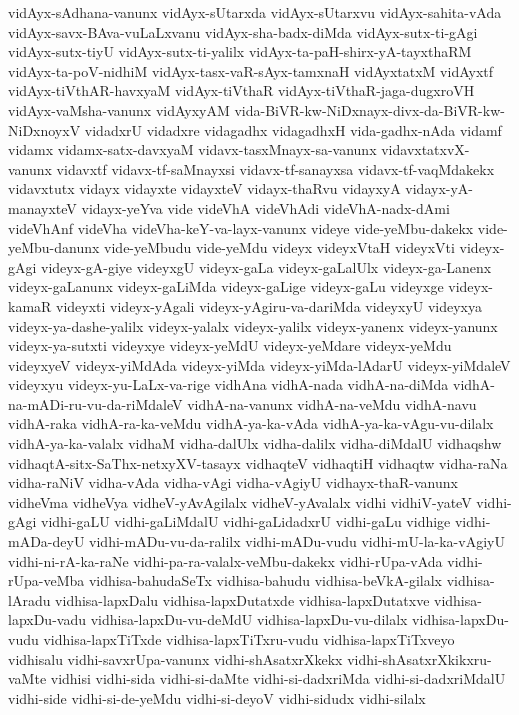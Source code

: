 {vidAyx-sAdhana-vanunx
vidAyx-sUtarxda
vidAyx-sUtarxvu
vidAyx-sahita-vAda
vidAyx-savx-BAva-vuLaLxvanu
vidAyx-sha-badx-diMda
vidAyx-sutx-ti-gAgi
vidAyx-sutx-tiyU
vidAyx-sutx-ti-yalilx
vidAyx-ta-paH-shirx-yA-tayxthaRM
vidAyx-ta-poV-nidhiM
vidAyx-tasx-vaR-sAyx-tamxnaH
vidAyxtatxM
vidAyxtf
vidAyx-tiVthAR-havxyaM
vidAyx-tiVthaR
vidAyx-tiVthaR-jaga-dugxroVH
vidAyx-vaMsha-vanunx
vidAyxyAM
vida-BiVR-kw-NiDxnayx-divx-da-BiVR-kw-NiDxnoyxV
vidadxrU
vidadxre
vidagadhx
vidagadhxH
vida-gadhx-nAda
vidamf
vidamx
vidamx-satx-davxyaM
vidavx-tasxMnayx-sa-vanunx
vidavxtatxvX-vanunx
vidavxtf
vidavx-tf-saMnayxsi
vidavx-tf-sanayxsa
vidavx-tf-vaqMdakekx
vidavxtutx
vidayx
vidayxte
vidayxteV
vidayx-thaRvu
vidayxyA
vidayx-yA-manayxteV
vidayx-yeYva
vide
videVhA
videVhAdi
videVhA-nadx-dAmi
videVhAnf
videVha
videVha-keY-va-layx-vanunx
videye
vide-yeMbu-dakekx
vide-yeMbu-danunx
vide-yeMbudu
vide-yeMdu
videyx
videyxVtaH
videyxVti
videyx-gAgi
videyx-gA-giye
videyxgU
videyx-gaLa
videyx-gaLalUlx
videyx-ga-Lanenx
videyx-gaLanunx
videyx-gaLiMda
videyx-gaLige
videyx-gaLu
videyxge
videyx-kamaR
videyxti
videyx-yAgali
videyx-yAgiru-va-dariMda
videyxyU
videyxya
videyx-ya-dashe-yalilx
videyx-yalalx
videyx-yalilx
videyx-yanenx
videyx-yanunx
videyx-ya-sutxti
videyxye
videyx-yeMdU
videyx-yeMdare
videyx-yeMdu
videyxyeV
videyx-yiMdAda
videyx-yiMda
videyx-yiMda-lAdarU
videyx-yiMdaleV
videyxyu
videyx-yu-LaLx-va-rige
vidhAna
vidhA-nada
vidhA-na-diMda
vidhA-na-mADi-ru-vu-da-riMdaleV
vidhA-na-vanunx
vidhA-na-veMdu
vidhA-navu
vidhA-raka
vidhA-ra-ka-veMdu
vidhA-ya-ka-vAda
vidhA-ya-ka-vAgu-vu-dilalx
vidhA-ya-ka-valalx
vidhaM
vidha-dalUlx
vidha-dalilx
vidha-diMdalU
vidhaqshw
vidhaqtA-sitx-SaThx-netxyXV-tasayx
vidhaqteV
vidhaqtiH
vidhaqtw
vidha-raNa
vidha-raNiV
vidha-vAda
vidha-vAgi
vidha-vAgiyU
vidhayx-thaR-vanunx
vidheVma
vidheVya
vidheV-yAvAgilalx
vidheV-yAvalalx
vidhi
vidhiV-yateV
vidhi-gAgi
vidhi-gaLU
vidhi-gaLiMdalU
vidhi-gaLidadxrU
vidhi-gaLu
vidhige
vidhi-mADa-deyU
vidhi-mADu-vu-da-ralilx
vidhi-mADu-vudu
vidhi-mU-la-ka-vAgiyU
vidhi-ni-rA-ka-raNe
vidhi-pa-ra-valalx-veMbu-dakekx
vidhi-rUpa-vAda
vidhi-rUpa-veMba
vidhisa-bahudaSeTx
vidhisa-bahudu
vidhisa-beVkA-gilalx
vidhisa-lAradu
vidhisa-lapxDalu
vidhisa-lapxDutatxde
vidhisa-lapxDutatxve
vidhisa-lapxDu-vadu
vidhisa-lapxDu-vu-deMdU
vidhisa-lapxDu-vu-dilalx
vidhisa-lapxDu-vudu
vidhisa-lapxTiTxde
vidhisa-lapxTiTxru-vudu
vidhisa-lapxTiTxveyo
vidhisalu
vidhi-savxrUpa-vanunx
vidhi-shAsatxrXkekx
vidhi-shAsatxrXkikxru-vaMte
vidhisi
vidhi-sida
vidhi-si-daMte
vidhi-si-dadxriMda
vidhi-si-dadxriMdalU
vidhi-side
vidhi-si-de-yeMdu
vidhi-si-deyoV
vidhi-sidudx
vidhi-silalx
}
